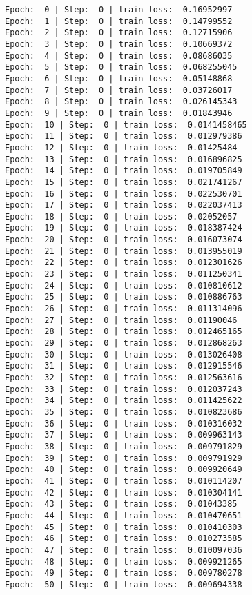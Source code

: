 \documentclass[11pt]{article}
\begin{document}
    \begin{Verbatim}[commandchars=\\\{\}]
Epoch:  0 | Step:  0 | train loss:  0.16952997
Epoch:  1 | Step:  0 | train loss:  0.14799552
Epoch:  2 | Step:  0 | train loss:  0.12715906
Epoch:  3 | Step:  0 | train loss:  0.10669372
Epoch:  4 | Step:  0 | train loss:  0.08686035
Epoch:  5 | Step:  0 | train loss:  0.068255045
Epoch:  6 | Step:  0 | train loss:  0.05148868
Epoch:  7 | Step:  0 | train loss:  0.03726017
Epoch:  8 | Step:  0 | train loss:  0.026145343
Epoch:  9 | Step:  0 | train loss:  0.01843946
Epoch:  10 | Step:  0 | train loss:  0.0141458465
Epoch:  11 | Step:  0 | train loss:  0.012979386
Epoch:  12 | Step:  0 | train loss:  0.01425484
Epoch:  13 | Step:  0 | train loss:  0.016896825
Epoch:  14 | Step:  0 | train loss:  0.019705849
Epoch:  15 | Step:  0 | train loss:  0.021741267
Epoch:  16 | Step:  0 | train loss:  0.022530701
Epoch:  17 | Step:  0 | train loss:  0.022037413
Epoch:  18 | Step:  0 | train loss:  0.02052057
Epoch:  19 | Step:  0 | train loss:  0.018387424
Epoch:  20 | Step:  0 | train loss:  0.016073074
Epoch:  21 | Step:  0 | train loss:  0.013955019
Epoch:  22 | Step:  0 | train loss:  0.012301626
Epoch:  23 | Step:  0 | train loss:  0.011250341
Epoch:  24 | Step:  0 | train loss:  0.010810612
Epoch:  25 | Step:  0 | train loss:  0.010886763
Epoch:  26 | Step:  0 | train loss:  0.011314096
Epoch:  27 | Step:  0 | train loss:  0.01190046
Epoch:  28 | Step:  0 | train loss:  0.012465165
Epoch:  29 | Step:  0 | train loss:  0.012868263
Epoch:  30 | Step:  0 | train loss:  0.013026408
Epoch:  31 | Step:  0 | train loss:  0.012915546
Epoch:  32 | Step:  0 | train loss:  0.012563616
Epoch:  33 | Step:  0 | train loss:  0.012037243
Epoch:  34 | Step:  0 | train loss:  0.011425622
Epoch:  35 | Step:  0 | train loss:  0.010823686
Epoch:  36 | Step:  0 | train loss:  0.010316032
Epoch:  37 | Step:  0 | train loss:  0.009963143
Epoch:  38 | Step:  0 | train loss:  0.009791829
Epoch:  39 | Step:  0 | train loss:  0.009791929
Epoch:  40 | Step:  0 | train loss:  0.009920649
Epoch:  41 | Step:  0 | train loss:  0.010114207
Epoch:  42 | Step:  0 | train loss:  0.010304141
Epoch:  43 | Step:  0 | train loss:  0.01043385
Epoch:  44 | Step:  0 | train loss:  0.010470651
Epoch:  45 | Step:  0 | train loss:  0.010410303
Epoch:  46 | Step:  0 | train loss:  0.010273585
Epoch:  47 | Step:  0 | train loss:  0.010097036
Epoch:  48 | Step:  0 | train loss:  0.009921265
Epoch:  49 | Step:  0 | train loss:  0.009780278
Epoch:  50 | Step:  0 | train loss:  0.009694338

\end{Verbatim}
\end{document}
